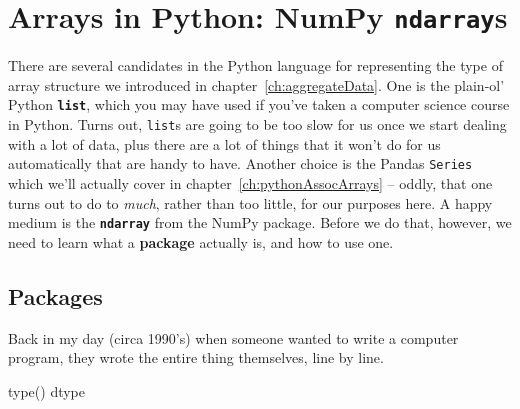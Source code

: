


\chapter{Arrays in Python: NumPy \texttt{ndarray}s}

There are several candidates in the Python language for representing the type
of array structure we introduced in chapter~\ref{ch:aggregateData}. One is the
plain-ol' Python \textbf{\texttt{list}}, which you may have used if you've
taken a computer science course in Python. Turns out, \texttt{list}s are going
to be too slow for us once we start dealing with a lot of data, plus there are
a lot of things that it won't do for us automatically that are handy to have.
Another choice is the Pandas \texttt{Series} which we'll actually cover in
chapter~\ref{ch:pythonAssocArrays} -- oddly, that one turns out to do to
\textit{much}, rather than too little, for our purposes here. A happy medium is
the \textbf{\texttt{ndarray}} from the NumPy package. Before we do that,
however, we need to learn what a \textbf{package} actually is, and how to use
one.

\section{Packages}

Back in my day (circa 1990's) when someone wanted to write a computer program,
they wrote the entire thing themselves, line by line.

type()
dtype
